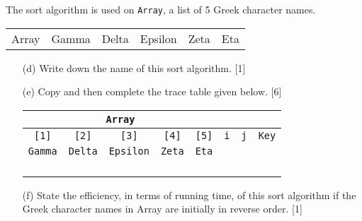 The sort algorithm is used on \texttt{Array}, a list of 5 Greek character
names.
\noindent \begin{center}
\begin{tabular}{c|c|c|c|c|c|}
\cline{2-6} \cline{3-6} \cline{4-6} \cline{5-6} \cline{6-6} 
Array & Gamma & Delta & Epsilon & Zeta & Eta\tabularnewline
\cline{2-6} \cline{3-6} \cline{4-6} \cline{5-6} \cline{6-6} 
\end{tabular}
\par\end{center}
\begin{enumerate}
\item[(d)]  Write down the name of this sort algorithm. \hfill{}{[}1{]}
\item[(e)]  Copy and then complete the trace table given below. \hfill{}{[}6{]}
\noindent \begin{center}
\begin{tabular}{|c|c|c|c|c|c|c|c|}
\hline 
\multicolumn{5}{|c|}{\texttt{Array}} & \multicolumn{3}{c|}{}\tabularnewline
\hline 
\texttt{{[}1{]}} & \texttt{{[}2{]}} & \texttt{{[}3{]}} & \texttt{{[}4{]}} & \texttt{{[}5{]}} & \texttt{i} & \texttt{j} & \texttt{Key}\tabularnewline
\hline 
\texttt{Gamma} & \texttt{Delta} & \texttt{Epsilon} & \texttt{Zeta} & \texttt{Eta} &  &  & \tabularnewline
\hline 
 &  &  &  &  &  &  & \tabularnewline
\hline 
 &  &  &  &  &  &  & \tabularnewline
\hline 
 &  &  &  &  &  &  & \tabularnewline
\hline 
 &  &  &  &  &  &  & \tabularnewline
\end{tabular}
\par\end{center}
\item[(f)]  State the efficiency, in terms of running time, of this sort algorithm
if the Greek character names in Array are initially in reverse order.
\hfill{}{[}1{]}
\end{enumerate}